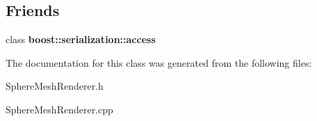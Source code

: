 \subsection*{Friends}
\begin{DoxyCompactItemize}
\item 
\hypertarget{class_sphere_mesh_renderer_ac98d07dd8f7b70e16ccb9a01abf56b9c}{
class {\bfseries boost::serialization::access}}
\label{class_sphere_mesh_renderer_ac98d07dd8f7b70e16ccb9a01abf56b9c}

\end{DoxyCompactItemize}


The documentation for this class was generated from the following files:\begin{DoxyCompactItemize}
\item 
SphereMeshRenderer.h\item 
SphereMeshRenderer.cpp\end{DoxyCompactItemize}
